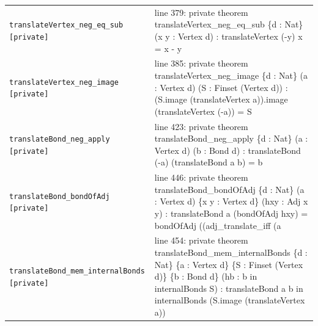 \documentclass[10pt]{article}
\begin{document}
\begin{longtable}{>{\raggedright\arraybackslash}p{} >{\raggedright\arraybackslash}p{}}
\texttt{translateVertex\_\allowbreak{}neg\_\allowbreak{}eq\_\allowbreak{}sub [private]} & {\ttfamily\scriptsize line 379:\allowbreak{} private theorem translateVertex\_\allowbreak{}neg\_\allowbreak{}eq\_\allowbreak{}sub \{d :\allowbreak{} Nat\} (\allowbreak{}x y :\allowbreak{} Vertex d)\allowbreak{} :\allowbreak{} translateVertex (\allowbreak{}-\allowbreak{}y)\allowbreak{} x =\allowbreak{} x -\allowbreak{} y} \\[0.45em]
\texttt{translateVertex\_\allowbreak{}neg\_\allowbreak{}image [private]} & {\ttfamily\scriptsize line 385:\allowbreak{} private theorem translateVertex\_\allowbreak{}neg\_\allowbreak{}image \{d :\allowbreak{} Nat\} (\allowbreak{}a :\allowbreak{} Vertex d)\allowbreak{} (\allowbreak{}S :\allowbreak{} Finset (\allowbreak{}Vertex d)\allowbreak{})\allowbreak{} :\allowbreak{} (\allowbreak{}S.\allowbreak{}image (\allowbreak{}translateVertex a)\allowbreak{})\allowbreak{}.\allowbreak{}image (\allowbreak{}translateVertex (\allowbreak{}-\allowbreak{}a)\allowbreak{})\allowbreak{} =\allowbreak{} S} \\[0.45em]
\texttt{translateBond\_\allowbreak{}neg\_\allowbreak{}apply [private]} & {\ttfamily\scriptsize line 423:\allowbreak{} private theorem translateBond\_\allowbreak{}neg\_\allowbreak{}apply \{d :\allowbreak{} Nat\} (\allowbreak{}a :\allowbreak{} Vertex d)\allowbreak{} (\allowbreak{}b :\allowbreak{} Bond d)\allowbreak{} :\allowbreak{} translateBond (\allowbreak{}-\allowbreak{}a)\allowbreak{} (\allowbreak{}translateBond a b)\allowbreak{} =\allowbreak{} b} \\[0.45em]
\texttt{translateBond\_\allowbreak{}bondOfAdj [private]} & {\ttfamily\scriptsize line 446:\allowbreak{} private theorem translateBond\_\allowbreak{}bondOfAdj \{d :\allowbreak{} Nat\} (\allowbreak{}a :\allowbreak{} Vertex d)\allowbreak{} \{x y :\allowbreak{} Vertex d\} (\allowbreak{}hxy :\allowbreak{} Adj x y)\allowbreak{} :\allowbreak{} translateBond a (\allowbreak{}bondOfAdj hxy)\allowbreak{} =\allowbreak{} bondOfAdj (\allowbreak{}(\allowbreak{}adj\_\allowbreak{}translate\_\allowbreak{}iff (\allowbreak{}a} \\[0.45em]
\texttt{translateBond\_\allowbreak{}mem\_\allowbreak{}internalBonds [private]} & {\ttfamily\scriptsize line 454:\allowbreak{} private theorem translateBond\_\allowbreak{}mem\_\allowbreak{}internalBonds \{d :\allowbreak{} Nat\} \{a :\allowbreak{} Vertex d\} \{S :\allowbreak{} Finset (\allowbreak{}Vertex d)\allowbreak{}\} \{b :\allowbreak{} Bond d\} (\allowbreak{}hb :\allowbreak{} b in internalBonds S)\allowbreak{} :\allowbreak{} translateBond a b in internalBonds (\allowbreak{}S.\allowbreak{}image (\allowbreak{}translateVertex a)\allowbreak{})\allowbreak{}} \\[0.45em]

\end{longtable}
\end{document}
